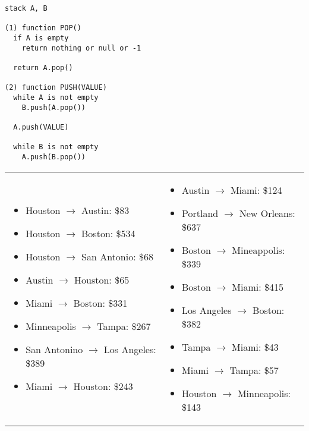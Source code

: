 \documentclass[11pt,addpoints]{exam}
\begin{document}
\begin{questions}

\begin{verbatim}
stack A, B

(1) function POP()
  if A is empty
    return nothing or null or -1

  return A.pop()

(2) function PUSH(VALUE)
  while A is not empty
    B.push(A.pop())

  A.push(VALUE)

  while B is not empty
    A.push(B.pop())

\end{verbatim}



\begin{table}[H]
  \begin{tabular}{p{}p{}}
\begin{itemize}
  \item Houston $\to$ Austin: \$83
  \item Houston $\to$ Boston: \$534
  \item Houston $\to$ San Antonio: \$68
  \item Austin $\to$ Houston: \$65
  \item Miami $\to$ Boston: \$331
  \item Minneapolis $\to$ Tampa: \$267
  \item San Antonino $\to$ Los Angeles: \$389
  \item Miami $\to$ Houston: \$243
\end{itemize} &
\begin{itemize}
  \item Austin $\to$ Miami: \$124
  \item Portland $\to$ New Orleans: \$637
  \item Boston $\to$ Mineappolis: \$339
  \item Boston $\to$ Miami: \$415
  \item Los Angeles $\to$ Boston: \$382 
  \item Tampa $\to$ Miami: \$43
  \item Miami $\to$ Tampa: \$57
  \item Houston $\to$ Minneapolis: \$143
\end{itemize}
\end{tabular}
\end{table}


\end{questions}
\end{document}
